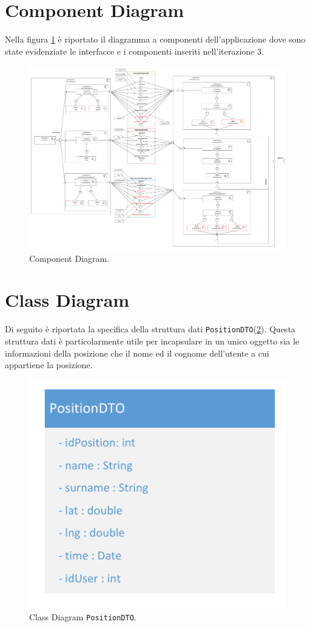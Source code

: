 \section{Component Diagram}
Nella figura \ref{fig:ComponentDiagram_iterazione3} è riportato il diagramma a componenti dell'applicazione dove sono state evidenziate le interfacce e i componenti inseriti nell'iterazione 3. 
\begin{figure}[h!]
	\centering
	\includegraphics[width=1\linewidth]{./Iterazione 3/OtherFiles/UML - Component view}
	\caption{Component Diagram.}
	\label{fig:ComponentDiagram_iterazione3}
\end{figure}

\clearpage

\section{Class Diagram}
Di seguito è riportata la specifica della struttura dati \texttt{PositionDTO}(\Fig\ref{fig:ClassDiagramDTO_iterazione3}). Questa struttura dati è particolarmente utile per incapsulare in un unico oggetto sia le informazioni della posizione che il nome ed il cognome dell'utente a cui appartiene la posizione.

\begin{figure}[h!]
	\centering
	\includegraphics[width=0.5\linewidth]{./Iterazione 3/OtherFiles/DTOSpecification}
	\caption{Class Diagram \texttt{PositionDTO}.}
	\label{fig:ClassDiagramDTO_iterazione3}
\end{figure}

